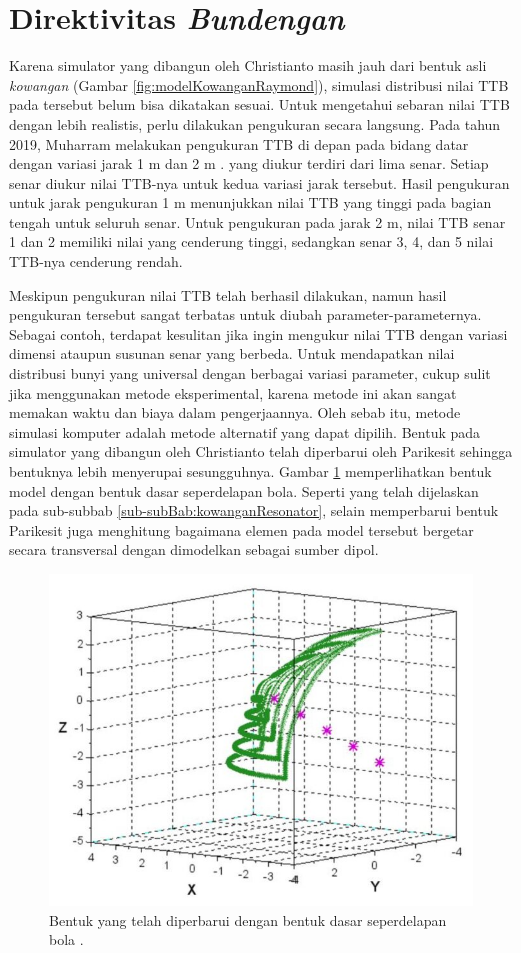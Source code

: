\section{Direktivitas \textit{Bundengan}}
Karena simulator yang dibangun oleh Christianto masih jauh dari bentuk asli \textit{kowangan} (Gambar \ref{fig:modelKowanganRaymond}), simulasi distribusi nilai TTB pada \kowangan tersebut belum bisa dikatakan sesuai. Untuk mengetahui sebaran nilai TTB dengan lebih realistis, perlu dilakukan pengukuran secara langsung. Pada tahun 2019, Muharram melakukan pengukuran TTB di depan \bundengan pada bidang datar dengan variasi jarak 1 m dan 2 m \cite{skripsiMuharram}. \Bundengan yang diukur terdiri dari lima senar. Setiap senar diukur nilai TTB-nya untuk kedua variasi jarak tersebut. Hasil pengukuran untuk jarak pengukuran 1 m menunjukkan nilai TTB yang tinggi pada bagian tengah untuk seluruh senar. Untuk pengukuran pada jarak 2 m, nilai TTB senar 1 dan 2 memiliki nilai yang cenderung tinggi, sedangkan senar 3, 4, dan 5 nilai TTB-nya cenderung rendah. \par 
Meskipun pengukuran nilai TTB \bundengan telah berhasil dilakukan, namun hasil pengukuran tersebut sangat terbatas untuk diubah parameter-parameternya. Sebagai contoh, terdapat kesulitan jika ingin mengukur nilai TTB dengan variasi dimensi \kowangan ataupun susunan senar yang berbeda. Untuk mendapatkan nilai distribusi bunyi yang universal dengan berbagai variasi parameter, cukup sulit jika menggunakan metode eksperimental, karena metode ini akan sangat memakan waktu dan biaya dalam pengerjaannya. Oleh sebab itu, metode simulasi komputer adalah metode alternatif yang dapat dipilih. Bentuk \kowangan pada simulator yang dibangun oleh Christianto \cite{skripsiRaymond} telah diperbarui oleh Parikesit sehingga bentuknya lebih menyerupai \kowangan sesungguhnya. Gambar \ref{fig:fokusSuaraKowanganSamping} memperlihatkan bentuk model \kowangan dengan bentuk dasar seperdelapan bola. Seperti yang telah dijelaskan pada sub-subbab \ref{sub-subBab:kowanganResonator}, selain memperbarui bentuk \kowangan Parikesit juga menghitung bagaimana elemen pada model \kowangan tersebut bergetar secara transversal dengan dimodelkan sebagai sumber dipol. \par 
\begin{figure}[t!]
    \centering
    \includegraphics[width= 8 cm]{Gambar/fokusSuaraKowanganSamping.jpg}
    \caption{Bentuk \kowangan yang telah diperbarui dengan bentuk dasar seperdelapan bola \cite{alatMusikPersonal}.}
    \label{fig:fokusSuaraKowanganSamping}
\end{figure}
